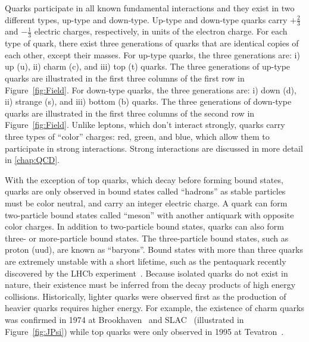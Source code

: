 Quarks participate in all known fundamental interactions and they exist in two different types, up-type and down-type. Up-type and down-type quarks carry $+\frac{2}{3}$ and $-\frac{1}{3}$ electric charges, respectively, in units of the electron charge. For each type of quark, there exist three generations of quarks that are identical copies of each other, except their masses. For up-type quarks, the three generations are: i) up (u), ii) charm (c), and iii) top (t) quarks. The three generations of up-type quarks are illustrated in the first three columns of the first row in Figure~\ref{fig:Field}. For down-type quarks, the three generations are: i) down (d), ii) strange (s), and iii) bottom (b) quarks. The three generations of down-type quarks are illustrated in the first three columns of the second row in Figure~\ref{fig:Field}. Unlike leptons, which don't interact strongly, quarks carry three types of ``color'' charges: red, green, and blue, which allow them to participate in strong interactions. Strong interactions are discussed in more detail in \autoref{chap:QCD}.

With the exception of top quarks, which decay before forming bound states, quarks are only observed in bound states called ``hadrons'' as stable particles must be color neutral, and carry an integer electric charge. A quark can form two-particle bound states called ``meson'' with another antiquark with opposite color charges. In addition to two-particle bound states, quarks can also form three- or more-particle bound states. The three-particle bound states, such as proton (uud), are known as ``baryons''. Bound states with more than three quarks are extremely unstable with a short lifetime, such as the pentaquark recently discovered by the \ac{LHCb} experiment~\cite{LHCb:2015yax}. Because isolated quarks do not exist in nature, their existence must be inferred from the decay products of high energy collisions. Historically, lighter quarks were observed first as the production of heavier quarks requires higher energy. For example, the existence of charm quarks was confirmed in 1974 at Brookhaven~\cite{E598:1974sol} and SLAC~\cite{SLAC-SP-017:1974ind} (illustrated in Figure~\ref{fig:JPsi}) while top quarks were only observed in 1995 at Tevatron~\cite{CDF:1995wbb,D0:1995jca}.

